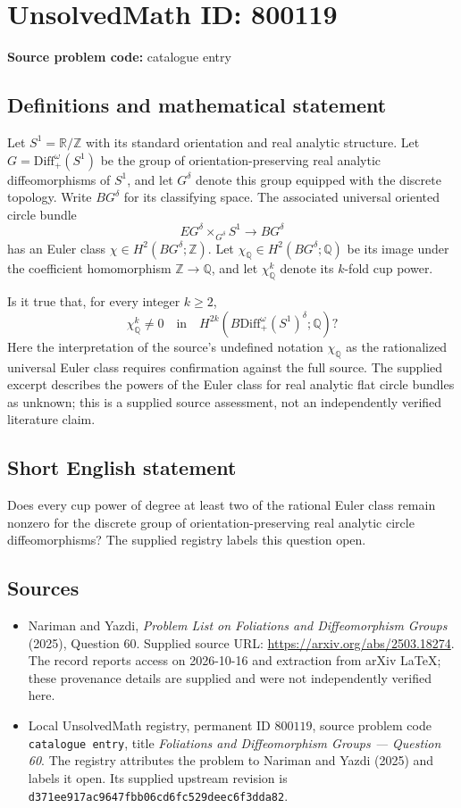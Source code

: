 \documentclass[11pt]{article}
\newcommand{\Z}{\mathbb{Z}}
\newcommand{\Q}{\mathbb{Q}}
\newcommand{\R}{\mathbb{R}}
\begin{document}
\section*{UnsolvedMath ID: 800119}
\textbf{Source problem code:} catalogue entry
\subsection{Definitions and mathematical statement}
Let \(S^1=\R/\Z\) with its standard orientation and real analytic structure. Let \(G=\mathrm{Diff}_+^\omega(S^1)\) be the group of orientation-preserving real analytic diffeomorphisms of \(S^1\), and let \(G^\delta\) denote this group equipped with the discrete topology. Write \(BG^\delta\) for its classifying space. The associated universal oriented circle bundle
\[
EG^\delta\times_{G^\delta}S^1\longrightarrow BG^\delta
\]
has an Euler class \(\chi\in H^2(BG^\delta;\Z)\). Let \(\chi_{\Q}\in H^2(BG^\delta;\Q)\) be its image under the coefficient homomorphism \(\Z\to\Q\), and let \(\chi_{\Q}^k\) denote its \(k\)-fold cup power.

Is it true that, for every integer \(k\geq 2\),
\[
\chi_{\Q}^k\neq 0\quad\text{in}\quad H^{2k}\!\left(B\mathrm{Diff}_+^\omega(S^1)^\delta;\Q\right)?
\]
Here the interpretation of the source's undefined notation \(\chi_{\Q}\) as the rationalized universal Euler class requires confirmation against the full source. The supplied excerpt describes the powers of the Euler class for real analytic flat circle bundles as unknown; this is a supplied source assessment, not an independently verified literature claim.
\subsection{Short English statement}
Does every cup power of degree at least two of the rational Euler class remain nonzero for the discrete group of orientation-preserving real analytic circle diffeomorphisms? The supplied registry labels this question open.
\subsection{Sources}
\begin{itemize}
\item Nariman and Yazdi, \emph{Problem List on Foliations and Diffeomorphism Groups} (2025), Question 60. Supplied source URL: \url{https://arxiv.org/abs/2503.18274}. The record reports access on 2026-10-16 and extraction from arXiv LaTeX; these provenance details are supplied and were not independently verified here.
\item Local UnsolvedMath registry, permanent ID \(800119\), source problem code \texttt{catalogue entry}, title \emph{Foliations and Diffeomorphism Groups --- Question 60}. The registry attributes the problem to Nariman and Yazdi (2025) and labels it open. Its supplied upstream revision is \texttt{d371ee917ac9647fbb06cd6fc529deec6f3dda82}.
\end{itemize}
\end{document}
